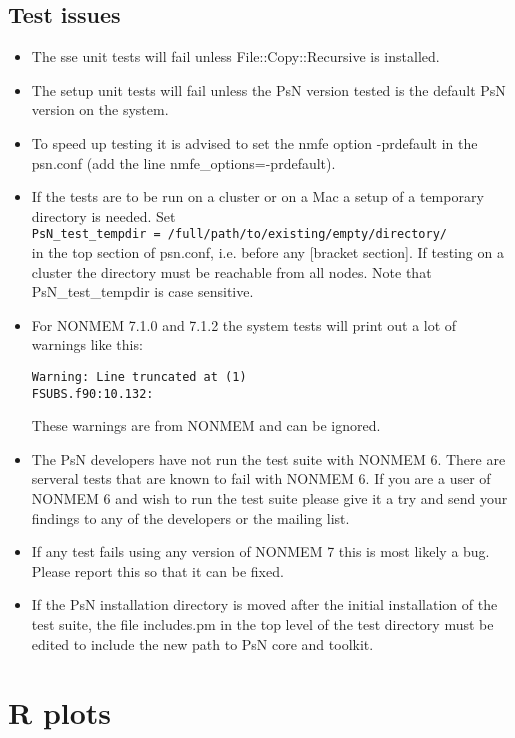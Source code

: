 \subsection{Test issues}
\begin{itemize}
    \item The sse unit tests will fail unless File::Copy::Recursive is installed.
    \item The setup unit tests will fail unless the PsN version tested is the default PsN version on the system.
	\item To speed up testing it is advised to set the nmfe option -prdefault in the psn.conf (add the line nmfe\_options=-prdefault).
	\item If the tests are to be run on a cluster or on a Mac a setup of a temporary directory is needed. Set\\
    \verb|PsN_test_tempdir = /full/path/to/existing/empty/directory/| \\
    in the top section of psn.conf, i.e. before any [bracket section].
     If testing on a cluster the directory must be reachable from all nodes.
     Note that PsN\_test\_tempdir is case sensitive.
	\item For NONMEM 7.1.0 and 7.1.2 the system tests will print out a lot of warnings like this:
\begin{verbatim}
Warning: Line truncated at (1)
FSUBS.f90:10.132:
\end{verbatim}
These warnings are from NONMEM and can be ignored.
	\item	The PsN developers have not run the test suite with NONMEM 6. There are serveral tests that are known to fail with NONMEM 6. If you are a user of NONMEM 6 and wish to run the test suite please give it a try and send your findings to any of the developers or the mailing list.
	\item If any test fails using any version of NONMEM 7 this is most likely a bug. Please report this so that it can be fixed.
    \item If the PsN installation directory is moved after the initial installation of the test suite, the file includes.pm in the top level of the test directory
    must be edited to include the new path to PsN core and toolkit. 
\end{itemize} 

\section{R plots}


